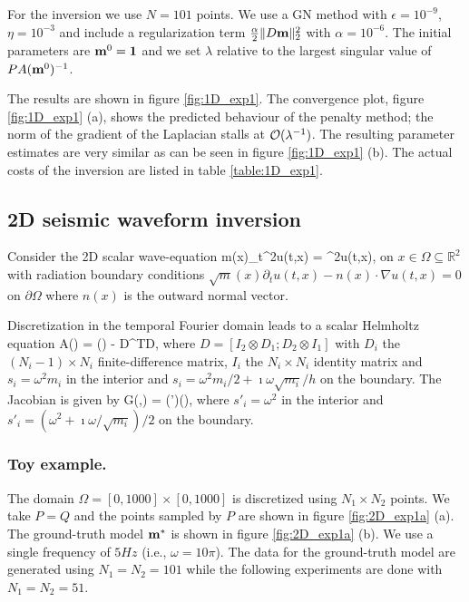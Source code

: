 \documentclass{iopart}
\begin{document}
For the inversion we use $N=101$ points.
We use a GN method with $\epsilon=10^{-9}$, $\eta=10^{-3}$ and include a regularization term $\frac{\alpha}{2} \|D\mathbf{m}\|_2^2$ with $\alpha = 10^{-6}$.
The initial parameters are $\mathbf{m}^0 = \mathbf{1}$ and we set $\lambda$ relative to the largest singular value of $PA(\mathbf{m}^0)^{-1}$.

The results are shown in figure \ref{fig:1D_exp1}. The convergence plot, figure \ref{fig:1D_exp1} (a), shows the predicted behaviour of the penalty method; the norm
of the gradient of the Laplacian stalls at $\mathcal{O}(\lambda^{-1})$. The resulting parameter estimates are very similar as can be seen 
in figure \ref{fig:1D_exp1} (b). The actual costs of the inversion are listed in table \ref{table:1D_exp1}.

\subsection{2D seismic waveform inversion}
Consider the 2D scalar wave-equation
\bq
m(x)\partial_t^2u(t,x) = \nabla^2u(t,x),
\eq
on $x \in \Omega \subseteq \mathbb{R}^2$  with radiation boundary conditions $\sqrt{m}(x)\partial_tu(t,x) - n(x)\cdot\nabla u(t,x) = 0$ on $\partial\Omega$
where $n(x)$ is the outward normal vector.

Discretization in the temporal Fourier domain leads to a scalar Helmholtz equation
\bq
A() = () - D^TD,
\eq
where $D = [I_2\otimes D_1; D_2\otimes I_1]$ with $D_i$ the $(N_i-1)\times N_i$ finite-difference matrix, $I_i$ the $N_i\times N_i$ identity matrix
and $s_i = \omega^2 m_i$ in the interior and $s_i = \omega^2 m_i/2 + \imath\omega\sqrt{m_i}/h$ on the boundary.
The Jacobian is given by
\bq
G(,) = (')(),
\eq
where $s'_i = \omega^2$ in the interior and $s'_i = (\omega^2 + \imath\omega/\sqrt{m_i})/2$ on the boundary.

\subsubsection{Toy example.}
The domain $\Omega = [0,1000]\times [0,1000]$ is discretized using $N_1\times N_2$ points. We take $P=Q$ and the points sampled by 
$P$ are shown in figure \ref{fig:2D_exp1a} (a). The ground-truth model $\mathbf{m}^*$ is shown in figure  \ref{fig:2D_exp1a} (b). We use a single frequency
of $5 Hz$ (i.e., $\omega = 10\pi$).
The data for the ground-truth model are generated using $N_1=N_2=101$ while the following experiments are done with $N_1=N_2=51$.
\end{document}
